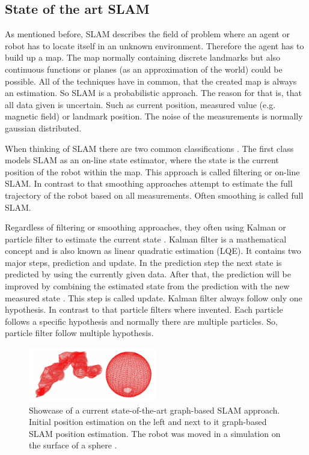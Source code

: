 \subsection{State of the art SLAM}
\label{chap:slam}
As mentioned before, SLAM describes the field of problem where an agent or robot has to locate itself
in an unknown environment. Therefore the agent has to build up a map. The map normally containing discrete 
landmarks but also continuous functions or planes (as an approximation of the world) could be possible. 
All of the techniques have in common, that the created map is always an estimation. So SLAM is a 
probabilistic approach. The reason for that is, that all data given is uncertain. Such as current 
position, measured value (e.g. magnetic field) or landmark position. The noise of the measurements is 
normally gaussian distributed. 

When thinking of SLAM there are two common classifications \cite{grisetti_tutorial_2010}. The first 
class models SLAM as an on-line state estimator, where the state is the current position of the robot 
within the map. This approach is called filtering or on-line SLAM. In contrast to that smoothing 
approaches attempt to estimate the full trajectory of the robot based on all measurements. 
Often smoothing is called full SLAM.

Regardless of filtering or smoothing approaches, they often using Kalman or particle filter to estimate
the current state \cite{grisetti_tutorial_2010}. Kalman filter is a mathematical concept and is also known
as linear quadratic estimation (LQE). It contains two major steps, prediction and update.
In the prediction step the next state is predicted by using the currently given data. After that, 
the prediction will be improved by combining the estimated state from the prediction with the new 
measured state \cite{kalman_filter_2001}. This step is called update. Kalman filter always follow only one
hypothesis. In contrast to that particle filters where invented. Each particle follows a specific
hypothesis and normally there are multiple particles. So, particle filter follow multiple hypothesis.

\begin{figure}[h!]
	\centering
	\includegraphics[width=0.5\textwidth]{images/grisetti_slam_showcase.png}
	\caption{
        Showcase of a current state-of-the-art graph-based SLAM approach.
        Initial position estimation on the left and next to it graph-based 
        SLAM position estimation. The robot was moved in a simulation on 
        the surface of a sphere \cite{grisetti_tutorial_2010}.
        }
	\label{fig:grisetti_slam_showcase}
\end{figure}

